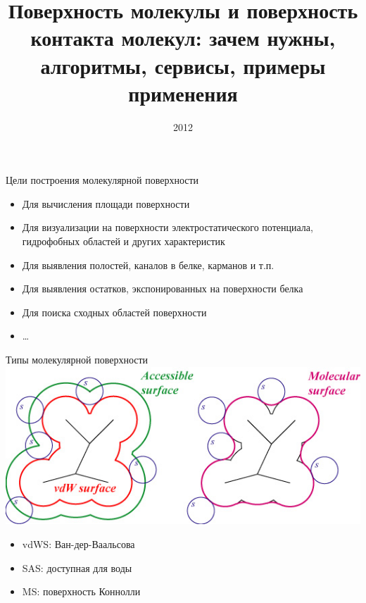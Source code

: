 \documentclass{beamer}
\title[Поверхность молекулы]{Поверхность молекулы и поверхность
    контакта молекул: зачем нужны, алгоритмы, сервисы, примеры применения}
\date{2012}
\begin{document}
    \begin{frame}
        \titlepage
    \end{frame}

    \begin{frame}{Цели построения молекулярной поверхности}
        \begin{itemize}
        \item Для вычисления площади поверхности
        \item Для визуализации на поверхности электростатического потенциала,
            гидрофобных областей и других характеристик
        \item Для выявления полостей, каналов в белке, карманов и т.п.
        \item Для выявления остатков, экспонированных на поверхности белка
        \item Для поиска сходных областей поверхности
        \item \dots
        \end{itemize}
    \end{frame}

    \begin{frame}{Типы молекулярной поверхности}
        \includegraphics[width=\linewidth]{types.jpg}
        \begin{itemize}
        \item vdWS: Ван-дер-Ваальсова
        \item SAS: доступная для воды
        \item MS: поверхность Коннолли
        \end{itemize}
    \end{frame}
\end{document}
